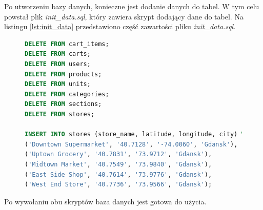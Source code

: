 Po utworzeniu bazy danych, konieczne jest dodanie danych do tabel. W tym celu powstał plik \textit{init\_data.sql}, który zawiera skrypt dodający dane do tabel. Na listingu \ref{lst:init_data} przedstawiono część zawartości pliku \textit{init\_data.sql}.

\begin{figure}[H]
\begin{lstlisting}[language=SQL, caption=Przykładowa definicja inicjalizacji danych, label=lst:init_data]
DELETE FROM cart_items;
DELETE FROM carts;
DELETE FROM users;
DELETE FROM products;
DELETE FROM units;
DELETE FROM categories;
DELETE FROM sections;
DELETE FROM stores;

INSERT INTO stores (store_name, latitude, longitude, city) VALUES
('Downtown Supermarket', '40.7128', '-74.0060', 'Gdansk'),
('Uptown Grocery', '40.7831', '73.9712', 'Gdansk'),
('Midtown Market', '40.7549', '73.9840', 'Gdansk'),
('East Side Shop', '40.7614', '73.9776', 'Gdansk'),
('West End Store', '40.7736', '73.9566', 'Gdansk');

\end{lstlisting}
\end{figure}
Po wywołaniu obu skryptów baza danych jest gotowa do użycia.
